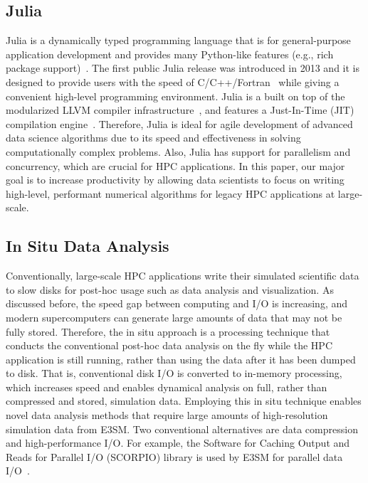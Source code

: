 \documentclass{juliacon}
\begin{document}
\subsection{Julia}

Julia is a dynamically typed programming language that is for general-purpose application development and provides many Python-like features (e.g., rich package support)~\cite{bezanson2017julia}. The first public Julia release was introduced in 2013 and it is designed to provide users with the speed of C/C++/Fortran~\cite{bezanson2017julia} while giving a convenient high-level programming environment. Julia is a built on top of the modularized LLVM compiler infrastructure~\cite{lattner2004llvm}, and features a Just-In-Time (JIT) compilation engine~\cite{aycock2003brief}. Therefore, Julia is ideal for agile development of advanced data science algorithms due to its speed and effectiveness in solving computationally complex problems. Also, Julia has support for parallelism and concurrency, which are crucial for HPC applications. In this paper, our major goal is to increase productivity by allowing data scientists to focus on writing high-level, performant numerical algorithms for legacy HPC applications at large-scale.






\subsection{In Situ Data Analysis} 


Conventionally, large-scale HPC applications write their simulated scientific data to slow disks for post-hoc usage such as data analysis and visualization. As discussed before, the speed gap between computing and I/O is increasing, and modern supercomputers can generate large amounts of data that may not be fully stored. Therefore, the in situ approach is a processing technique that conducts the conventional post-hoc data analysis on the fly while the HPC application is still running, rather than using the data after it has been dumped to disk. That is, conventional disk I/O is converted to in-memory processing, which increases speed and enables dynamical analysis on full, rather than compressed and stored, simulation data. Employing this in situ technique enables novel data analysis methods that require large amounts of high-resolution simulation data from E3SM. Two conventional alternatives are data compression and high-performance I/O. For example, the Software for Caching Output and Reads for Parallel I/O (SCORPIO) library is used by E3SM for parallel data I/O~\cite{scorpio}.
\end{document}
